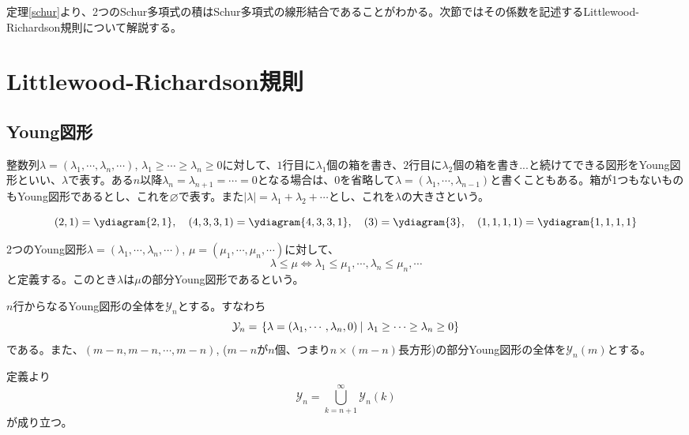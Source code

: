 \documentclass{ltjsarticle}
\begin{document}
定理\ref{schur}より、2つのSchur多項式の積はSchur多項式の線形結合であることがわかる。次節ではその係数を記述するLittlewood-Richardson規則について解説する。





\section{Littlewood-Richardson規則}
\subsection{Young図形}
\begin{defin}
    整数列$\lambda=(\lambda_1,\cdots,\lambda_n,\cdots)$, $\lambda_1\geq\cdots\geq\lambda_n\geq 0$に対して、$1$行目に$\lambda_1$個の箱を書き、$2$行目に$\lambda_2$個の箱を書き...と続けてできる図形をYoung図形といい、$\lambda$で表す。ある$n$以降$\lambda_n=\lambda_{n+1}=\cdots=0$となる場合は、$0$を省略して$\lambda=(\lambda_1,\cdots,\lambda_{n-1})$と書くこともある。箱が1つもないものもYoung図形であるとし、これを$\varnothing$で表す。また$|\lambda|=\lambda_1+\lambda_2+\cdots$とし、これを$\lambda$の大きさという。
\end{defin}

\begin{eg}
    \[
    (2,1)=\ydiagram{2,1},\quad (4,3,3,1)=\ydiagram{4,3,3,1},\quad (3)=\ydiagram{3},\quad (1,1,1,1)=\ydiagram{1,1,1,1}
    \]
\end{eg}

\begin{defin}
    2つのYoung図形$\lambda=(\lambda_1,\cdots,\lambda_n,\cdots)$, $\mu=(\mu_1,\cdots,\mu_n,\cdots)$に対して、
    \[
    \lambda\leq\mu\Leftrightarrow \lambda_1\leq \mu_1,\cdots,\lambda_n\leq\mu_n,\cdots   
    \]
    と定義する。このとき$\lambda$は$\mu$の部分Young図形であるという。
\end{defin}

\begin{defin}
    $n$行からなるYoung図形の全体を$\mathcal{Y}_n$とする。すなわち
    \[
    \mathcal{Y}_n=\left.\left\{\lambda=(\lambda_1,\cdots,\lambda_n,0) \: \right| \: \lambda_1\geq \cdots\geq\lambda_n\geq 0\right\}
    \]
    である。また、$(m-n,m-n,\cdots,m-n)$, ($m-n$が$n$個、つまり$n\times(m-n)$長方形)の部分Young図形の全体を$\mathcal{Y}_n(m)$とする。
\end{defin}


定義より
\[
\mathcal{Y}_n=\bigcup_{k=n+1}^\infty\mathcal{Y}_n(k)    
\]
が成り立つ。
\end{document}
